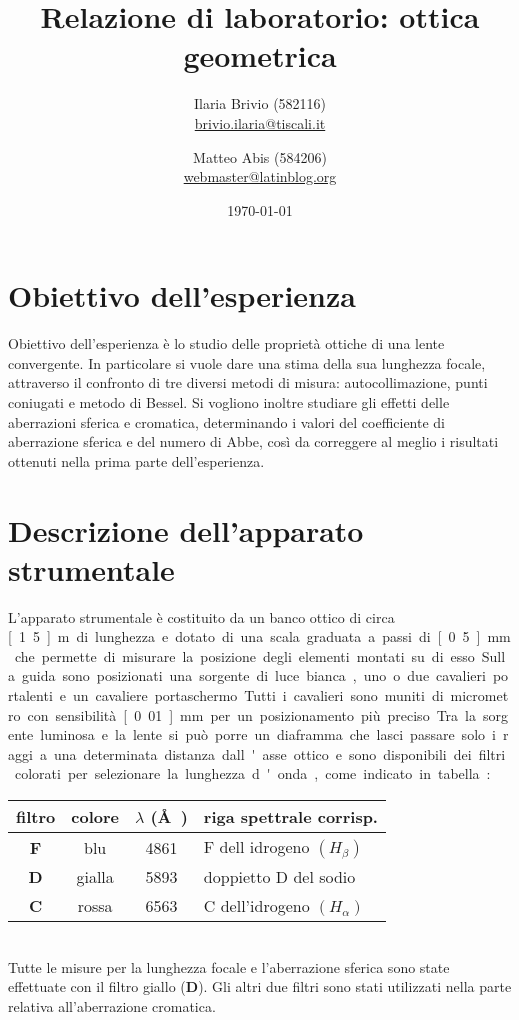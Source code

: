 \documentclass[italian,a4paper]{article}
\begin{document}
\title{Relazione di laboratorio: ottica geometrica}
\author{\normalsize Ilaria Brivio (582116)\\%
\normalsize \url{brivio.ilaria@tiscali.it}%
\and %
\normalsize Matteo Abis (584206)\\ %
\normalsize \url{webmaster@latinblog.org}}
\date{\today}
\maketitle
\section{Obiettivo dell'esperienza}
Obiettivo dell'esperienza è lo studio delle proprietà ottiche di una lente convergente. In particolare si vuole dare una stima della sua lunghezza focale, attraverso il confronto di tre diversi metodi di misura: autocollimazione, punti coniugati e metodo di Bessel. Si vogliono inoltre studiare gli effetti delle aberrazioni sferica e cromatica, determinando i valori del coefficiente di aberrazione sferica e del numero di Abbe, così da correggere al meglio i risultati ottenuti nella prima parte dell'esperienza.

\section{Descrizione dell'apparato strumentale}
L'apparato strumentale è costituito da un banco ottico di circa \unit[1.5]{m} di lunghezza e dotato di una scala graduata a passi di \unit[0.5]{mm} che permette di misurare la posizione degli elementi montati su di esso. Sulla guida sono posizionati una sorgente di luce bianca, uno o due cavalieri portalenti e un cavaliere portaschermo. Tutti i cavalieri sono muniti di micrometro con sensibilità \unit[0.01]{mm} per un posizionamento più preciso.

Tra la sorgente luminosa e la lente si può porre un diaframma che lasci passare solo i raggi a una determinata distanza dall'asse ottico e sono disponibili dei filtri colorati per selezionare la lunghezza d'onda, come indicato in tabella:
\begin{table*}[h]
\centering
 \begin{tabular}{cccl}
filtro&	colore&	$\lambda$ (\unit{\AA{}})&	riga spettrale corrisp.\\\hline
\textbf{F}&	blu&	4861&				F dell idrogeno $(H_{\beta})$\\
\textbf{D}&	gialla&	5893&				doppietto D del sodio\\
\textbf{C}&	rossa&	6563&				C dell'idrogeno $(H_{\alpha})$
\end{tabular}
\end{table*}\\
Tutte le misure per la lunghezza focale e l'aberrazione sferica sono state effettuate con il filtro giallo (\textbf{D}). Gli altri due filtri sono stati utilizzati nella parte relativa all'aberrazione cromatica.
\end{document}
